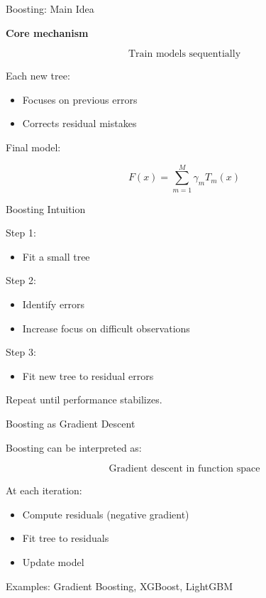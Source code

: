 \documentclass{beamer}
\begin{document}
\begin{frame}{Boosting: Main Idea}

\textbf{Core mechanism}

\[
\text{Train models sequentially}
\]

\vspace{0.4cm}

Each new tree:

\begin{itemize}
    \item Focuses on previous errors
    \item Corrects residual mistakes
\end{itemize}

\vspace{0.4cm}

Final model:

\[
F(x) = \sum_{m=1}^M \gamma_m T_m(x)
\]

\end{frame}

\begin{frame}{Boosting Intuition}

Step 1:
\begin{itemize}
    \item Fit a small tree
\end{itemize}

Step 2:
\begin{itemize}
    \item Identify errors
    \item Increase focus on difficult observations
\end{itemize}

Step 3:
\begin{itemize}
    \item Fit new tree to residual errors
\end{itemize}

\vspace{0.4cm}

Repeat until performance stabilizes.

\end{frame}

\begin{frame}{Boosting as Gradient Descent}

Boosting can be interpreted as:

\[
\text{Gradient descent in function space}
\]

\vspace{0.4cm}

At each iteration:

\begin{itemize}
    \item Compute residuals (negative gradient)
    \item Fit tree to residuals
    \item Update model
\end{itemize}

\vspace{0.4cm}

Examples: Gradient Boosting, XGBoost, LightGBM

\end{frame}
\end{document}
